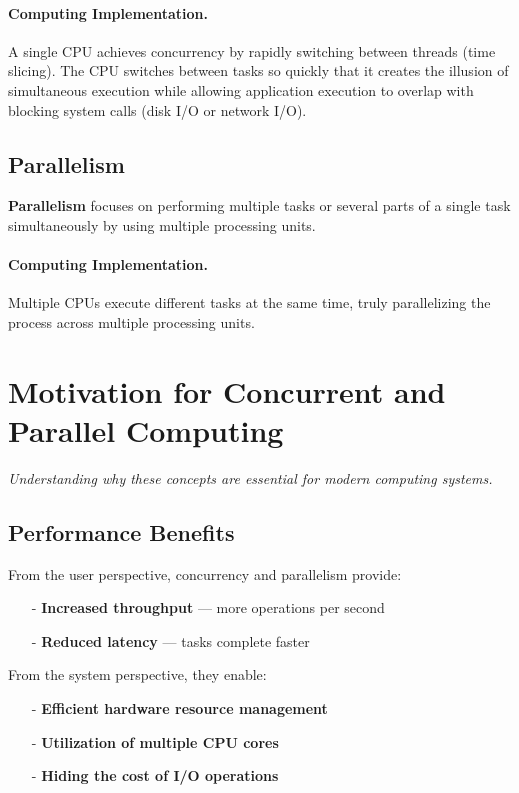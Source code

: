 \documentclass[../../compsys.tex]{subfiles}
\begin{document}
\paragraph{Computing Implementation.} A single CPU achieves concurrency by rapidly switching between threads (time slicing). The CPU switches between tasks so quickly that it creates the illusion of simultaneous execution while allowing application execution to overlap with blocking system calls (disk I/O or network I/O).

\subsection{Parallelism}
\textbf{Parallelism} focuses on performing multiple tasks or several parts of a single task simultaneously by using multiple processing units.

\paragraph{Computing Implementation.} Multiple CPUs execute different tasks at the same time, truly parallelizing the process across multiple processing units.

\section{Motivation for Concurrent and Parallel Computing}
\textit{Understanding why these concepts are essential for modern computing systems.}

\subsection{Performance Benefits}
From the user perspective, concurrency and parallelism provide:
\begin{itemize}
  \item[-] \textbf{Increased throughput} — more operations per second
  \item[-] \textbf{Reduced latency} — tasks complete faster
\end{itemize}

From the system perspective, they enable:
\begin{itemize}
  \item[-] \textbf{Efficient hardware resource management}
  \item[-] \textbf{Utilization of multiple CPU cores}
  \item[-] \textbf{Hiding the cost of I/O operations}
\end{itemize}
\end{document}
